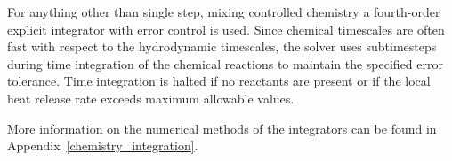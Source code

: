 For anything other than single step, mixing controlled chemistry a fourth-order explicit integrator with error control is used.  Since chemical timescales are often fast with respect to the hydrodynamic timescales, the solver uses subtimesteps during time integration of the chemical reactions to maintain the specified error tolerance.  Time integration is halted if no reactants are present or if the local heat release rate exceeds maximum allowable values.

More information on the numerical methods of the integrators can be found in Appendix~\ref{chemistry_integration}.

